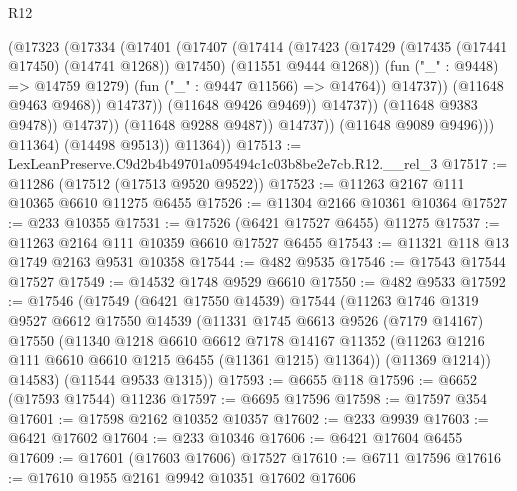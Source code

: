 \begin{lexlean}{R12}
\begin{coremodule}
                                    (@17323
                                      (@17334
                                        (@17401
                                          (@17407
                                            (@17414
                                              (@17423
                                                (@17429
                                                  (@17435 (@17441 @17450) (@14741 @1268))
                                                  @17450)
                                                (@11551 @9444 @1268))
                                              (fun ("_" : @9448) => @14759 @1279)
                                              (fun ("_" : @9447 @11566) => @14764))
                                            @14737))
                                        (@11648 @9463 @9468))
                                      @14737))
                                  (@11648 @9426 @9469))
                                @14737))
                            (@11648 @9383 @9478))
                          @14737))
                      (@11648 @9288 @9487))
                    @14737))
                (@11648 @9089 @9496)))
            @11364)
          (@14498 @9513))
        @11364))
@17513 := LexLeanPreserve.C9d2b4b49701a095494c1c03b8be2e7cb.R12.__rel_3
@17517 := @11286 (@17512 (@17513 @9520 @9522))
@17523 := @11263 @2167 @111 @10365 @6610 @11275 @6455
@17526 := @11304 @2166 @10361 @10364
@17527 := @233 @10355
@17531 := @17526 (@6421 @17527 @6455) @11275
@17537 := @11263 @2164 @111 @10359 @6610 @17527 @6455
@17543 := @11321 @118 @13 @1749 @2163 @9531 @10358
@17544 := @482 @9535
@17546 := @17543 @17544 @17527
@17549 := @14532 @1748 @9529 @6610
@17550 := @482 @9533
@17592 := @17546
    (@17549
      (@6421 @17550 @14539)
      @17544
      (@11263
        @1746
        @1319
        @9527
        @6612
        @17550
        @14539
        (@11331
          @1745
          @6613
          @9526
          (@7179 @14167)
          @17550
          (@11340
            @1218
            @6610
            @6612
            @7178
            @14167
            @11352
            (@11263 @1216 @111 @6610 @6610 @1215 @6455 (@11361 @1215) @11364))
          (@11369 @1214))
        @14583)
      (@11544 @9533 @1315))
@17593 := @6655 @118
@17596 := @6652 (@17593 @17544) @11236
@17597 := @6695 @17596
@17598 := @17597 @354
@17601 := @17598 @2162 @10352 @10357
@17602 := @233 @9939
@17603 := @6421 @17602
@17604 := @233 @10346
@17606 := @6421 @17604 @6455
@17609 := @17601 (@17603 @17606) @17527
@17610 := @6711 @17596
@17616 := @17610 @1955 @2161 @9942 @10351 @17602 @17606

\end{coremodule}
\end{lexlean}
